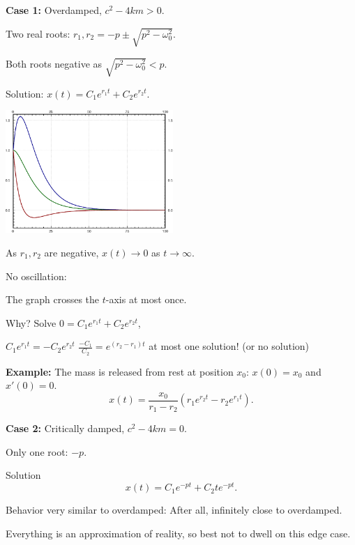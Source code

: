 \documentclass[10pt,aspectratio=169]{beamer}
\begin{document}
\begin{frame}
\textbf{Case 1:}
Overdamped, \quad $c^2-4km > 0$.

\medskip
\pause

Two real roots: \quad $r_1,r_2 = -p \pm \sqrt{p^2 - \omega_0^2}$.

\medskip
\pause

Both roots negative as \quad $\sqrt{p^2 - \omega_0^2} < p$.

\medskip
\pause

Solution: \quad
$x(t) = C_1 e^{r_1 t} + C_2 e^{r_2 t}$.

\vspace*{-1.1in}

\hfill\includegraphics[width=2.5in]{../figures/mv-overdamped}

\vspace*{-0.69in}

\pause
As $r_1,r_2$ are negative, \quad
$x(t) \to 0$ as $t \to \infty$.

\medskip
\pause

No oscillation:

The graph crosses the
$t$-axis at most once.

\pause

Why?  Solve $0 = C_1 e^{r_1 t} + C_2 e^{r_2 t}$,

\pause

\thus\quad $C_1 e^{r_1 t} = - C_2 e^{r_2 t}$
\pause
\wthus
$\frac{-C_1}{C_2} = e^{(r_2-r_1) t}$
\wthus
at most one solution! (or no solution)

\medskip
\pause

\textbf{Example:}
The mass is released from rest at position $x_0$:
$x(0) = x_0$ and $x'(0) = 0$.
\[
x(t) = \frac{x_0}{r_1-r_2} \left(r_1 e^{r_2 t} - r_2 e^{r_1 t} \right) .
\]
\end{frame}

\begin{frame}
\textbf{Case 2:} 
Critically damped, \quad $c^2 - 4km = 0$.

\medskip
\pause

Only one root: \quad $-p$.

\medskip
\pause

Solution
\[
x(t) = C_1 e^{-pt} + C_2 t e^{-pt} .
\]

\medskip
\pause

Behavior very similar to overdamped: After all, infinitely close
to overdamped.

\medskip
\pause

Everything is an approximation of reality,
so best not to dwell on this edge case.

\end{frame}
\end{document}

